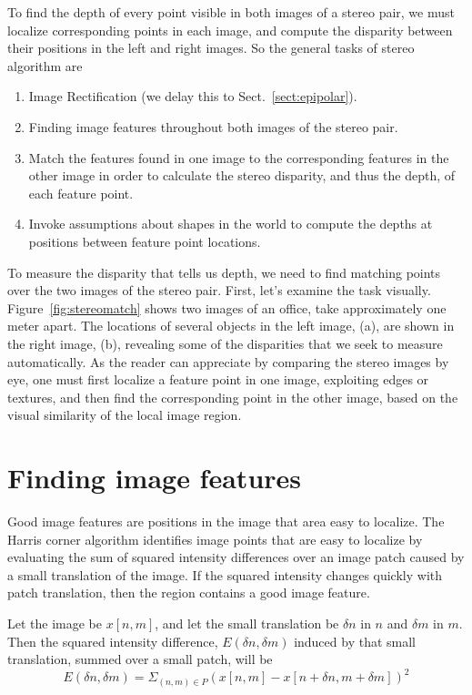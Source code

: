 To find the depth of every point visible in both images of a stereo pair, we must localize corresponding points in each image, and compute the disparity between their positions in the left and right images. So the general tasks of stereo algorithm are

\begin{enumerate}
    \item Image Rectification (we delay this to Sect.~\ref{sect:epipolar}).
    \item Finding image features throughout both images of the stereo pair.
    \item Match the features found in one image to the corresponding features in the other image in order to calculate the stereo disparity, and thus the depth, of each feature point.
    \item Invoke assumptions about shapes in the world to compute the depths at positions between feature point locations.
\end{enumerate}


To measure the disparity that tells us depth, we need to find matching points over the two images of the stereo pair.  First, let's examine the task visually.   Figure~\ref{fig:stereomatch} shows two images of an office, take approximately one meter apart.  The locations of several objects in the left image, (a), are shown in the right image, (b), revealing some of the disparities that we seek to measure automatically.  As the reader can appreciate by comparing the stereo images by eye, one must first localize a feature point in one image, exploiting edges or textures, and then find the corresponding point in the other image, based on the visual similarity of the local image region.


\section{Finding image features}
Good image features are positions in the image that area easy to localize.  The Harris corner \cite{Harris88} algorithm identifies image points that are easy to localize by evaluating the sum of squared intensity differences over an image patch caused by a small translation of the image. If the squared intensity changes quickly with patch translation, then the region contains a good image feature. 

Let the image be $x[n,m]$, and let the small translation be $\delta n$ in $n$ and $\delta m$ in $m$.  Then the squared intensity difference, $E(\delta n, \delta m)$ induced by that small translation, summed over a small patch, will be
\begin{equation}
    E(\delta n, \delta m) = \Sigma_{(n, m) \in P}
    (x[n,m] - x[n + \delta n, m + \delta m])^2
    \label{eq:harris}
\end{equation}


